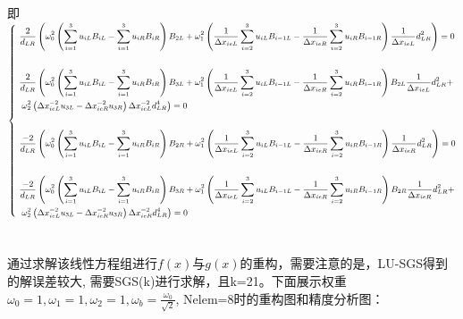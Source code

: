 \documentclass[a4paper,11pt,UTF8]{article}%
\theoremstyle{plain}
\begin{document}
\noindent 即\\
\noindent $\left\{\small
\begin{aligned}
	&\frac{2}{d_{LR}}\left(\omega_0^2\left(\sum_{i=1}^{3}u_{iL}B_{iL}-\sum_{i=1}^{3}u_{iR}B_{iR}\right)B_{2L}+\omega_1^2\left(\frac{1}{\Delta x_{ieL}}\sum_{i=2}^{3}u_{iL}B_{i-1 L}-\frac{1}{\Delta x_{ieR}}\sum_{i=2}^{3}u_{iR}B_{i-1 R}\right)\frac{1}{\Delta x_{ieL}}d_{LR}^2\right)=0\\
	~\\
	&\frac{2}{d_{LR}}\left(\omega_0^2\left(\sum_{i=1}^{3}u_{iL}B_{iL}-\sum_{i=1}^{3}u_{iR}B_{iR}\right)B_{3L}+\omega_1^2\left(\frac{1}{\Delta x_{ieL}}\sum_{i=2}^{3}u_{iL}B_{i-1L}-\frac{1}{\Delta x_{ieR}}\sum_{i=2}^{3}u_{iR}B_{i-1 R}\right)B_{2L}\frac{1}{\Delta x_{ieL}}d_{LR}^2+\right.\\
	&\left.\omega_2^2\left(\Delta x_{ieL}^{-2}u_{3L}-\Delta x_{ieR}^{-2}u_{3R}\right)\Delta x_{ieL}^{-2} d_{LR}^4\right)=0\\
	~\\
	&\frac{-2}{d_{LR}}\left(\omega_0^2\left(\sum_{i=1}^{3}u_{iL}B_{iL}-\sum_{i=1}^{3}u_{iR}B_{iR}\right)B_{2R}+\omega_1^2\left(\frac{1}{\Delta x_{ieL}}\sum_{i=2}^{3}u_{iL}B_{i-1 L}-\frac{1}{\Delta x_{ieR}}\sum_{i=2}^{3}u_{iR}B_{i-1 R}\right)\frac{1}{\Delta x_{ieR}}d_{LR}^2\right)=0\\
	~\\
	&\frac{-2}{d_{LR}}\left(\omega_0^2\left(\sum_{i=1}^{3}u_{iL}B_{iL}-\sum_{i=1}^{3}u_{iR}B_{iR}\right)B_{3R}+\omega_1^2\left(\frac{1}{\Delta x_{ieL}}\sum_{i=2}^{3}u_{iL}B_{i-1L}-\frac{1}{\Delta x_{ieR}}\sum_{i=2}^{3}u_{iR}B_{i-1 R}\right)B_{2R}\frac{1}{\Delta x_{ieR}}d_{LR}^2+\right.\\
	&\left.\omega_2^2\left(\Delta x_{ieL}^{-2}u_{3L}-\Delta x_{ieR}^{-2}u_{3R}\right)\Delta x_{ieR}^{-2} d_{LR}^4\right)=0\\
\end{aligned}
\right.$\leavevmode\\
~\\
~\\
\indent 通过求解该线性方程组进行$f\left(x\right)$与$g\left(x\right)$的重构，需要注意的是，LU-SGS得到的解误差较大, 需要SGS(k)进行求解，且k=21。下面展示权重$\omega_0=1, \omega_1=1, \omega_2=1, \omega_b=\frac{\omega_0}{\sqrt{2}}$, Nelem=8时的重构图和精度分析图：\\
\end{document}
